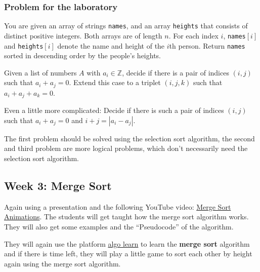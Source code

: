 \documentclass[10pt, oneside]{article}
\theoremstyle{remark}
\begin{document}
\subsubsection*{Problem for the laboratory}
\begin{tcolorbox}
  You are given an array of strings \texttt{names}, and an array \texttt{heights} that consists of distinct positive integers. Both arrays are of length $n$. For each index $i$, \texttt{names}$[i]$ and \texttt{heights}$[i]$ denote the name and height of the $i$th person. Return \texttt{names} sorted in descending order by the people's heights.

  \vspace{1em}

  Given a list of numbers $A$ with $a_i \in \mathbb{Z}$, decide if there is a pair of indices $(i, j)$ such that $a_i + a_j = 0$. Extend this case to a triplet $(i, j, k)$ such that $a_i + a_j + a_k = 0$.

  \vspace{1em}
  Even a little more complicated: Decide if there is such a pair of indices $(i, j)$ such that $a_i + a_j = 0$ and $i + j = |a_i - a_j|$.
\end{tcolorbox}
The first problem should be solved using the selection sort algorithm, the second and third problem are more logical problems, which don't necessarily need the selection sort algorithm.

\subsection{Week 3: Merge Sort}
Again using a presentation and the following YouTube video: \href{https://www.youtube.com/watch?v=ZRPoEKHXTJg}{Merge Sort Animations}. The students will get taught how the merge sort algorithm works. They will also get some examples and the \enquote{Pseudocode} of the algorithm.

They will again use the platform \href{https://tcs.uni-frankfurt.de/algo-learn-testing/refs_heads_feat-bubbleSort/en
}{algo learn} to learn the \textbf{merge sort} algorithm and if there is time left, they will play a little game to sort each other by height again using the merge sort algorithm.
\end{document}

